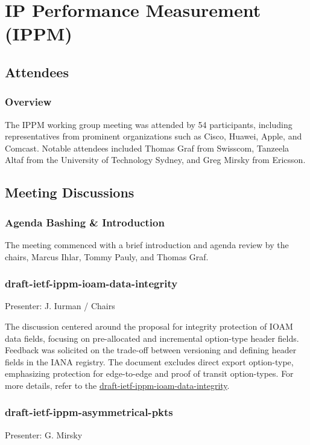 \documentclass{article}
\begin{document}
\newpage

\section{IP Performance Measurement (IPPM)}

\subsection{Attendees}
\subsubsection{Overview}
The IPPM working group meeting was attended by 54 participants, including representatives from prominent organizations such as Cisco, Huawei, Apple, and Comcast. Notable attendees included Thomas Graf from Swisscom, Tanzeela Altaf from the University of Technology Sydney, and Greg Mirsky from Ericsson.

\subsection{Meeting Discussions}

\subsubsection{Agenda Bashing \& Introduction}
The meeting commenced with a brief introduction and agenda review by the chairs, Marcus Ihlar, Tommy Pauly, and Thomas Graf.

\subsubsection{draft-ietf-ippm-ioam-data-integrity}
Presenter: J. Iurman / Chairs

The discussion centered around the proposal for integrity protection of IOAM data fields, focusing on pre-allocated and incremental option-type header fields. Feedback was solicited on the trade-off between versioning and defining header fields in the IANA registry. The document excludes direct export option-type, emphasizing protection for edge-to-edge and proof of transit option-types. For more details, refer to the \href{https://datatracker.ietf.org/doc/html/draft-ietf-ippm-ioam-data-integrity}{draft-ietf-ippm-ioam-data-integrity}.

\subsubsection{draft-ietf-ippm-asymmetrical-pkts}
Presenter: G. Mirsky
\end{document}
